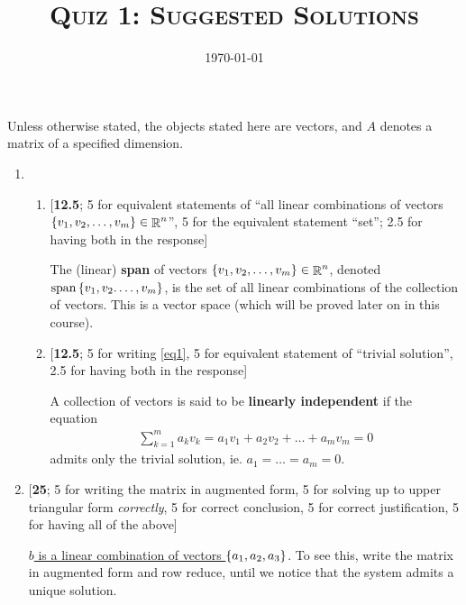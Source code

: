 \documentclass{amsart}
\title{\textsc{Quiz 1: Suggested Solutions}}
\date{\today}
\theoremstyle{definition}
\theoremstyle{definition}
\DeclareMathOperator{\R}{\mathbb{R}}
\DeclareMathOperator{\1}{\mathbbm{1}}
\DeclareMathOperator{\Span}{span}
\begin{document}
\sloppy
\maketitle

Unless otherwise stated, the objects stated here are vectors, and $A$ denotes a matrix of a specified dimension.

\bigskip

\begin{enumerate}[itemsep = 1.5mm]
	\item \begin{enumerate}
		\item \phantom{} [\textbf{12.5}; 5 for equivalent statements of ``all linear combinations of vectors $\set{v_1,v_2,\dots,v_m} \in \R^n$'', 5 for the equivalent statement ``set''; 2.5 for having both in the response]
		
		\bigskip
		
		The (linear) \textbf{span} of vectors $\set{v_1,v_2,\dots,v_m} \in \R^n$, denoted $\Span \set{v_1,v_2.\dots,v_m}$, is the set of all linear combinations of the collection of vectors. This is a vector space (which will be proved later on in this course).
		
		
		\item \phantom{} [\textbf{12.5}; 5 for writing \eqref{eq1}, 5 for equivalent statement of ``trivial solution'', 2.5 for having both in the response]
		
		\bigskip
		
		A collection of vectors is said to be \textbf{linearly independent} if the equation
		\begin{align}
		\label{eq1}
		\tag{$\star$}
		\sum_{k=1}^{m} a_k v_k = a_1 v_1 + a_2 v_2 + \dots + a_m v_m = 0
		\end{align}
		admits only the trivial solution, ie. $a_1 = \dots = a_m = 0$.
	\end{enumerate}


	\item \phantom{} [\textbf{25}; 5 for writing the matrix in augmented form, 5 for solving up to upper triangular form \textit{correctly}, 5 for correct conclusion, 5 for correct justification, 5 for having all of the above]
	
	\bigskip
	
	\uline{$b$ is a linear combination of vectors $\set{a_1,a_2,a_3}$}. To see this, write the matrix in augmented form and row reduce, until we notice that the system admits a unique solution.
	

\end{enumerate}
\end{document}
